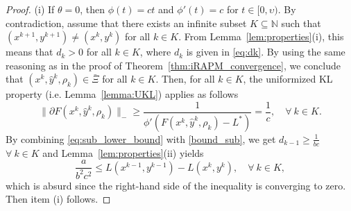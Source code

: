 \documentclass[pdflatex,sn-mathphys-num]{sn-jnl}
\numberwithin{equation}{section}%
\def\N{\mathbb{N}}
\theoremstyle{thmstyleone}%
\theoremstyle{thmstyletwo}%
\theoremstyle{thmstylethree}%
\begin{document}
\begin{proof}
{(i) If $\theta=0$, then $\phi(t) = ct$ and $\phi'(t) = c$ for $t\in [0,\upsilon)$. By contradiction, assume that there exists an infinite subset $K\subseteq \N$ such that $(x^{k+1},y^{k+1})\neq (x^k,y^k)$ for all $k\in K$. From Lemma~\ref{lem:properties}(i), this means that $d_k> 0$ for all $k\in K$, where $d_k$ is given in \eqref{eq:dk}. By using the same reasoning as in the proof of Theorem~\ref{thm:iRAPM_convergence}, we conclude that $(x^{k},\hat{y}^{k},\rho_k)\in \bar \Xi$ for all $k\in K$. Then, for all $k\in K$, the uniformized KL property (i.e. Lemma~\ref{lemma:UKL}) applies as follows 
\begin{equation}\label{eq:sub_lower_bound}
    \|\partial F(x^k,\hat{y}^k,\rho_k)\|_{-}\geq \frac{1}{\phi'(F(x^k,\hat{y}^k,\rho_k)-L^*)}=\frac{1}{c}, \quad \forall \ k\in K.
\end{equation}
By combining \eqref{eq:sub_lower_bound} with \eqref{bound_sub}, we get $ d_{k-1}\geq \frac{1}{bc} $ $ \forall \ k\in K$ and Lemma~\ref{lem:properties}(ii) yields
\begin{equation*}
    \frac{a}{b^2c^2}\leq L(x^{k-1},y^{k-1})-L(x^{k},y^{k}),\quad \forall \ k\in K,
\end{equation*}
which is absurd since the right-hand side of the inequality is converging to zero. Then item (i) follows.}


\end{proof}
\end{document}
